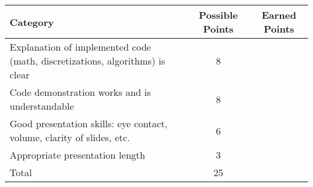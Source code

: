 \documentclass[a4paper, 12 pt]{curve}
\begin{document}
\vspace{2em}
\begin{center}
\begin{tabu}{| X | c | c |}\hline
\textbf{Category} & \textbf{Possible Points} & \textbf{Earned Points} \\ \hline \hline
Explanation of implemented code (math, discretizations, algorithms) is clear & 8 & \\ \hline
Code demonstration works and is understandable & 8 & \\ \hline
Good presentation skills: eye contact, volume, clarity of slides, etc. & 6 & \\ \hline
Appropriate presentation length & 3 & \\ \hline
Total & 25 & \\\hline
\end{tabu} 
\end{center}
\end{document}
